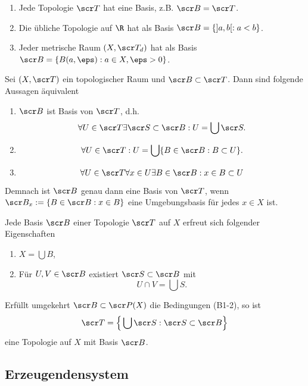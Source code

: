 \begin{ex}
	\begin{enumerate}[1)]
		\item
			Jede Topologie $\scr T$ hat eine Basis, z.B. $\scr B = \scr T$.
		\item
			Die übliche Topologie auf $\R$ hat als Basis $\scr B = \{ ]a,b[ : a < b \}$.
		\item
			Jeder metrische Raum $(X, \scr T_d)$ hat als Basis $\scr B = \{ B(a, \eps) : a \in X, \eps > 0 \}$.
	\end{enumerate}
\end{ex}


\begin{prop}
	Sei $(X, \scr T)$ ein topologischer Raum und $\scr B \subset \scr T$.
	Dann sind folgende Aussagen äquivalent
	\begin{enumerate}[1)]
		\item
			$\scr B$ ist Basis von $\scr T$, d.h.
			\[
				\forall U \in \scr T \exists \scr S \subset \scr B : U = \bigcup \scr S.
			\]
		\item
			\[
				\forall U \in \scr T : U = \bigcup \{ B \in \scr B : B \subset U \}.
			\]
		\item
			\[
				\forall U \in \scr T \forall x \in U \exists B \in \scr B : x \in B \subset U
			\]
	\end{enumerate}
	Demnach ist $\scr B$ genau dann eine Basis von $\scr T$, wenn $\scr B_x := \{ B \in \scr B : x \in B \}$ eine Umgebungsbasis für jedes $x \in X$ ist.
\end{prop}

\begin{st}
	Jede Basis $\scr B$ einer Topologie $\scr T$ auf $X$ erfreut sich folgender Eigenschaften
	\begin{enumerate}[(B1)]
		\item
			$X = \bigcup B$,
		\item
			Für $U, V \in \scr B$ existiert $\scr S \subset \scr B$ mit
			\[
				U \cap V = \bigcup S.
			\]
	\end{enumerate}
	Erfüllt umgekehrt $\scr B \subset \scr P(X)$ die Bedingungen (B1-2), so ist
	\[
		\scr T = \Big\{ \bigcup \scr S : \scr S \subset \scr B \Big\}
	\]
	eine Topologie auf $X$ mit Basis $\scr B$.
\end{st}

\subsection{Erzeugendensystem}


